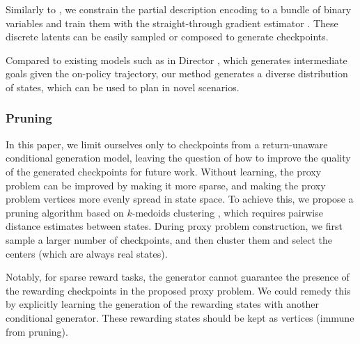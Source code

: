 Similarly to \citet{hafner2023mastering}, we constrain the partial description encoding to a bundle of binary variables and train them with the straight-through gradient estimator \citep{bengio2013estimating}. These discrete latents can be easily sampled or composed to generate checkpoints. 

Compared to existing models such as in Director \citep{hafner2022deep}, which generates intermediate goals given the on-policy trajectory, our method generates a diverse distribution of states, which can be used to plan in novel scenarios.

\subsubsection{Pruning}
In this paper,%
we limit ourselves only to checkpoints from a return-unaware conditional generation model, leaving the question of how to improve the quality of the generated checkpoints for future work. Without learning, the proxy problem can be improved by making it more sparse, and making the proxy problem vertices more evenly spread in state space. To achieve this, we propose a pruning algorithm based on $k$-medoids clustering \citep{kaufman1990medoids}, which requires pairwise distance estimates between states. During proxy problem construction, we first sample a larger number of checkpoints, and then cluster them and select the centers (which are always real states).


Notably, for sparse reward tasks, the generator cannot guarantee the presence of the rewarding checkpoints in the proposed proxy problem. We could remedy this by explicitly learning the generation of the rewarding states with another conditional generator. These rewarding states should be kept as vertices (immune from pruning).

